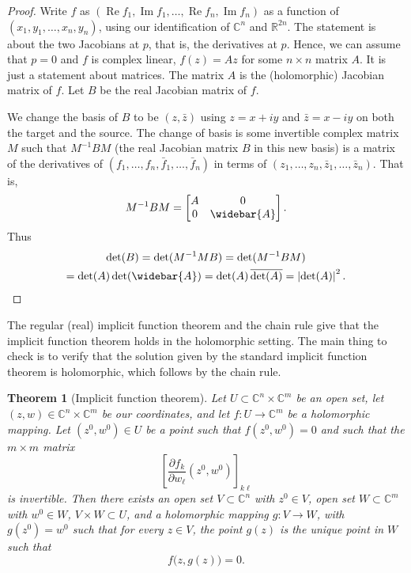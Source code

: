\documentclass[12pt,openany]{book}
\renewcommand{\Re}{\operatorname{Re}}
\renewcommand{\Im}{\operatorname{Im}}
\newcommand{\abs}[1]{\left\lvert {#1} \right\rvert}
\newcommand{\C}{{\mathbb{C}}}
\newcommand{\R}{{\mathbb{R}}}
\theoremstyle{plain}
\newtheorem{thm}{Theorem}[section]
\theoremstyle{remark}
\theoremstyle{definition}
\theoremstyle{exercise}
\theoremstyle{example}
\begin{document}
\begin{proof}
Write $f$ as
$(\Re f_1,\Im f_1, \ldots, \Re f_n, \Im f_n)$
as a function of $(x_1,y_1,\ldots,x_n,y_n)$,
using our identification of $\C^n$ and $\R^{2n}$.
The statement is about the two Jacobians at $p$, that is, the derivatives
at $p$.  Hence, we can assume that
$p=0$ and $f$ is complex linear, $f(z) = Az$ for some $n \times n$
matrix $A$.  It is just a statement about matrices.
The matrix $A$ is the (holomorphic) Jacobian matrix of $f$.
Let $B$ be the real Jacobian matrix of $f$.

We change the basis of $B$ to be $(z,\bar{z})$
using $z = x+iy$ and $\bar{z}=x-iy$
on both the target and the source.
The change of basis is some invertible
complex matrix $M$ such that
$M^{-1} B M$ (the real Jacobian matrix $B$ in this new basis)
is a matrix of the derivatives of
$(f_1,\ldots,f_n,\bar{f}_1,\ldots,\bar{f}_n)$
in terms of
$(z_1,\ldots,z_n,\bar{z}_1,\ldots,\bar{z}_n)$.
That is,
\begin{equation*}
M^{-1} B M =
\begin{bmatrix}
A & 0 \\
0 & \widebar{A}
\end{bmatrix} .
\end{equation*}
Thus
\begin{multline*}
\det (B) =
\det(M^{-1}M B)
=
\det(M^{-1} B M)
\\
=
\det(A) \det(\widebar{A})
=
\det(A) \, \overline{\det(A)}
=
\abs{\det(A)}^2 .  \qedhere
\end{multline*}
\end{proof}

The regular (real) implicit function theorem and the chain rule
give that the implicit function theorem holds in the holomorphic setting.
The main thing to check is to verify that the solution given by the
standard implicit function theorem is holomorphic, which follows by the
chain rule.

\begin{thm}[Implicit function theorem]\label{thm:ift}%
\pagebreak[2]
Let $U \subset \C^{n} \times \C^{m}$ be an open set, let $(z,w) \in \C^n \times
\C^m$ be our coordinates, and let $f \colon U \to \C^m$
be a holomorphic mapping.  Let $(z^0,w^0) \in U$ be a point such that
$f(z^0,w^0) = 0$ and such that the $m \times m$ matrix
\begin{equation*}
\left[
\frac{\partial f_k}{\partial w_\ell} (z^0,w^0)
\right]_{k\ell}
\end{equation*}
is invertible.
Then there exists an
open set $V \subset \C^n$ with $z^0 \in V$,
open set $W \subset \C^m$ with $w^0 \in W$,
$V \times W \subset U$,
and
a holomorphic
mapping $g \colon V \to W$, with $g(z^0) = w^0$
such that
for every $z \in V$, the point $g(z)$ is the unique point in $W$
such that
\begin{equation*}
f\bigl(z,g(z)\bigr) = 0 .
\end{equation*}
\end{thm}
\end{document}
